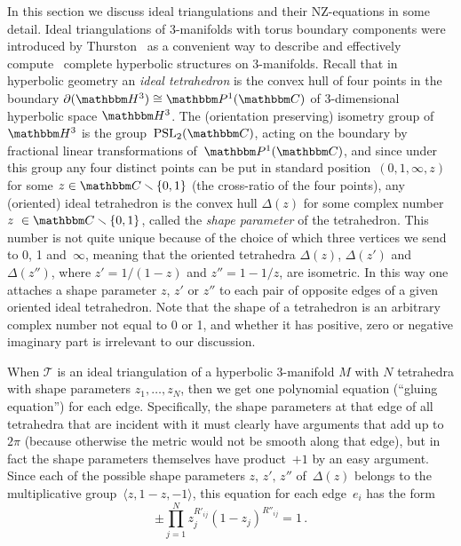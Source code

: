 \documentclass[12pt,reqno]{amsart}
\theoremstyle{definition}
\def\BC{\mathbbm C}
\def\BP{\mathbbm P}
\def\BH{\mathbbm H}
\def\calT{\mathcal T}
\def\PSL{\mathrm{PSL}}
\def\D{\Delta}
\def\be{\begin{equation}}
\def\ee{\end{equation}}
\def\sm{\smallsetminus}
\def\ssm{\sm}
\begin{document}
In this section we discuss ideal triangulations and their NZ-equations in some detail. 
Ideal triangulations of 3-manifolds with torus boundary components were introduced by
Thurston~\cite{Thurston} as a convenient way to describe and effectively
compute~\cite{snappy} complete hyperbolic structures on 3-manifolds.
Recall that in hyperbolic geometry an {\it ideal tetrahedron} is the convex
hull of four points in the boundary $\partial (\BH^3)\cong\BP^1(\BC)$ of 3-dimensional
hyperbolic space $\BH^3$.  The (orientation preserving) isometry group of~$\BH^3$ is the
group~$\PSL_2(\BC)$, 
acting on the boundary by fractional linear transformations of~$\BP^1(\BC)$, and since under 
this group any four distinct points can be put in standard position~$(0,1,\infty,z)$ for some 
$z\in\BC\ssm\{0,1\}$ (the cross-ratio of the four points), any (oriented) ideal tetrahedron is 
the convex hull $\D(z)$ for some complex number~$z~\in \BC\ssm\{0,1\}$, called the
{\it shape parameter} 
of the tetrahedron. This number is not quite unique because of the choice of which three
vertices
we send to 0, 1 and~$\infty$, meaning that the oriented tetrahedra $\D(z)$, $\D(z')$ and
$\D(z'')$,
where $z'=1/(1-z)$ and $z''=1-1/z$, are isometric. In this way one attaches a shape parameter 
$z$, $z'$ or $z''$ to each pair of opposite edges of a given oriented ideal tetrahedron.
Note that the shape of a tetrahedron is an arbitrary complex number not equal to 0 or 1,
and whether it has positive, zero or negative imaginary part is irrelevant to our discussion.

When $\calT$ is an ideal triangulation of a hyperbolic 3-manifold $M$ with $N$ tetrahedra
with shape parameters $z_1,\dots,z_N$, then we get one polynomial equation
(``gluing equation'') 
for each edge.  Specifically, the shape parameters at that edge of all tetrahedra that are
incident with it must clearly have arguments that add up to~$2\pi$ (because otherwise the 
metric would not be smooth along that edge), but in fact the shape parameters themselves
have product~$+1$ by an easy argument.  Since each of the possible shape parameters 
$z,\,z',\,z''$ of~$\D(z)$ belongs to the multiplicative
group~$\big\langle z,1-z,-1\big\rangle$, this equation for each edge~$e_i$  has the form 
\be
\label{edge}
\pm\prod_{j=1}^N z_j^{R'_{ij}} (1-z_j)^{R''_{ij}} = 1\,.
\ee
\end{document}
